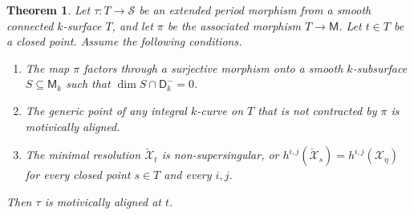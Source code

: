 \documentclass[11pt, letterpaper]{amsart}
\theoremstyle{plain}
\newtheorem{theorem}{Theorem}[section]
\theoremstyle{definition}
\newcommand{\<}{\langle}
\renewcommand{\>}{\rangle}
\newcommand{\shS}{\mathscr{S}}
\newcommand{\sfD}{\mathsf{D}}
\newcommand{\sfM}{\mathsf{M}}
\newcommand{\sX}{\mathcal{X}}
\begin{document}
\begin{theorem}
\label{lem: bad points}
    Let $\tau:T\to \shS$ be an extended period morphism from a smooth connected $k$-surface $T$, and let $\pi$ be the associated morphism $T \to \sfM$. Let $t \in T$ be a closed point. 
    Assume the following conditions. 
    \begin{enumerate}[label=\upshape{(\roman*)}]
        \item The map $\pi$ factors through a surjective morphism onto a smooth $k$-subsurface $S \subseteq \sfM_k$ such that $\dim S \cap \sfD^-_k = 0$. 
        \item The generic point of any integral $k$-curve on $T$ that is not contracted by $\pi$ is motivically aligned. 
        \item The minimal resolution $\breve{\sX}_t$ is non-supersingular, or $h^{i, j}(\breve{\sX}_s) = h^{i, j}(\sX_\eta)$ for every closed point $s\in T$ and every $i, j$. 
    \end{enumerate}
     Then $\tau$ is motivically aligned at $t$. 
\end{theorem}
\end{document}
